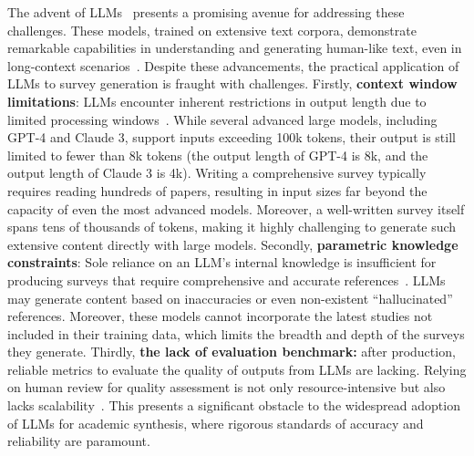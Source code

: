 The advent of LLMs~\cite{achiam2023gpt,touvron2023llama} presents a promising avenue for addressing these challenges. These models, trained on extensive text corpora, demonstrate remarkable capabilities in understanding and generating human-like text, even in long-context scenarios~\cite{chen2023extending,chen2023longlora,wang2024augmenting}. Despite these advancements, the practical application of LLMs to survey generation is fraught with challenges. Firstly, \textbf{context window limitations}: LLMs encounter inherent restrictions in output length due to limited processing windows~\cite{liu2024lost,kaddour2023challenges,shi2023large,li2023long,li2024long}. While several advanced large models, including GPT-4 and Claude 3, support inputs exceeding 100k tokens, their output is still limited to fewer than 8k tokens (the output length of GPT-4 is 8k, and the output length of Claude 3 is 4k). Writing a comprehensive survey typically requires reading hundreds of papers, resulting in input sizes far beyond the capacity of even the most advanced models. Moreover, a well-written survey itself spans tens of thousands of tokens, making it highly challenging to generate such extensive content directly with large models.
 Secondly, \textbf{parametric knowledge constraints}: Sole reliance on an LLM's internal knowledge is insufficient for producing surveys that require comprehensive and accurate references~\cite{wang2023surveyfact,ji2023survey,shao2024assisting}. LLMs may generate content based on inaccuracies or even non-existent ``hallucinated'' references. Moreover, these models cannot incorporate the latest studies not included in their training data, which limits the breadth and depth of the surveys they generate. Thirdly, \textbf{the lack of evaluation benchmark:} after production, reliable metrics to evaluate the quality of outputs from LLMs are lacking. Relying on human review for quality assessment is not only resource-intensive but also lacks scalability~\cite{pandalm2024,zheng2024judging,yu2024kieval}. This presents a significant obstacle to the widespread adoption of LLMs for academic synthesis, where rigorous standards of accuracy and reliability are paramount.

